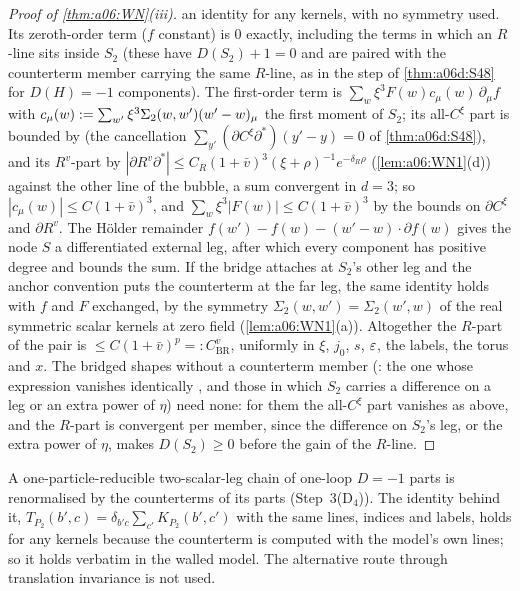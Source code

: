 \begin{proof}[Proof of \cref{thm:a06:WN}\textup{(iii)}]
an identity for any kernels, with no symmetry used. Its zeroth-order term ($f$ constant) is $0$ exactly, including the terms in which an $R$-line sits inside $S_2$ (these have $D(S_2)+1=0$ and are paired with the counterterm member carrying the same $R$-line, as in the step of \cref{thm:a06d:S48} for $D(H)=-1$ components). The first-order term is $\sum_w\xi^3F(w)c_\mu(w)\,\partial_\mu f$ with $c_\mu(w):=\sum_{w'}\xi^3\Sigma_2(w,w')(w'-w)_\mu$ the first moment of $S_2$; its all-$C^\xi$ part is bounded by \cite[(3.16)]{Ba3} (the cancellation $\sum_{y'}(\partial C^\xi\partial^*)(y'-y)=0$ of \cref{thm:a06d:S48}), and its $R^v$-part by $|\partial R^v\partial^*|\le C_R(1+\bar v)^3(\xi+\rho)^{-1}e^{-\delta_R\rho}$ (\cref{lem:a06:WN1}(d)) against the other line of the bubble, a sum convergent in $d=3$; so $|c_\mu(w)|\le C(1+\bar v)^3$, and $\sum_w\xi^3|F(w)|\le C(1+\bar v)^3$ by the bounds on $\partial C^\xi$ and $\partial R^v$. The H\"older remainder $f(w')-f(w)-(w'-w)\cdot\partial f(w)$ gives the node $S$ a differentiated external leg, after which every component has positive degree and \cite[(2.16)]{Ba3} bounds the sum. If the bridge attaches at $S_2$'s other leg and the anchor convention puts the counterterm at the far leg, the same identity holds with $f$ and $F$ exchanged, by the symmetry $\Sigma_2(w,w')=\Sigma_2(w',w)$ of the real symmetric scalar kernels at zero field (\cref{lem:a06:WN1}(a)). Altogether the $R$-part of the pair is $\le C(1+\bar v)^p=: C^v_{\mathrm{BR}}$, uniformly in $\xi$, $j_0$, $s$, $\varepsilon$, the labels, the torus and $x$. The bridged shapes without a counterterm member (\cite[(2.21a), (2.21c), (2.21e)]{Ba3}: the one whose expression vanishes identically \cite[p.~442]{Ba3}, and those in which $S_2$ carries a difference on a leg or an extra power of $\eta$) need none: for them the all-$C^\xi$ part vanishes as above, and the $R$-part is convergent per member, since the difference on $S_2$'s leg, or the extra power of $\eta$, makes $D(S_2)\ge0$ before the gain of the $R$-line.
\end{proof}

\begin{remark}\label{rem:a06:WNCH}
A one-particle-reducible two-scalar-leg chain of one-loop $D=-1$ parts is renormalised by the counterterms of its parts (Step~3(D$_4$)). The identity behind it, $T_{P_2}(b',c)=\delta_{b'c}\sum_{c'}K_{P_2}(b',c')$ with the same lines, indices and labels, holds for any kernels because the counterterm is computed with the model's own lines; so it holds verbatim in the walled model. The alternative route through translation invariance is not used.
\end{remark}
